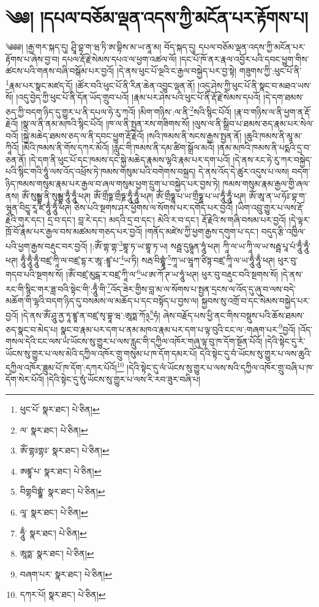 \setcounter{footnote}{0} 
\chapter{༄༅། །དཔལ་བཅོམ་ལྡན་འདས་ཀྱི་མངོན་པར་རྟོགས་པ།}༄༅༅། །རྒྱ་གར་སྐད་དུ། ཤྲཱི་བྷ་ག་ཝ་ཏི་ཨ་བྷིས་མ་ཡ་ནཱ་མ། བོད་སྐད་དུ། དཔལ་བཅོམ་ལྡན་འདས་ཀྱི་མངོན་པར་རྟོགས་པ་ཞེས་བྱ་བ། དཔལ་རྡོ་རྗེ་སེམས་དཔའ་ལ་ཕྱག་འཚལ་ལོ། །དང་པོ་ཁོ་ནར་རྣལ་འབྱོར་པའི་དབང་ཕྱུག་གིས་ཚངས་པའི་གནས་བཞི་བསྒོམ་པར་བྱའོ། །དེ་ནས་ཕུང་པོ་ལྔའི་ང་རྒྱལ་བསྐྱེད་པར་བྱ་སྟེ། གཟུགས་ཀྱི་:ཕུང་པོ་ནི་\footnote{ཕུང་པོ་  སྣར་ཐང་།  པེ་ཅིན། }རྣམ་པར་སྣང་མཛད་དོ། །ཚོར་བའི་ཕུང་པོ་ནི་རིན་ཆེན་འབྱུང་ལྡན་ནོ། །འདུ་ཤེས་ཀྱི་ཕུང་པོ་ནི་སྣང་བ་མཐའ་ཡས་སོ། །འདུ་བྱེད་ཀྱི་ཕུང་པོ་ནི་དོན་ཡོད་གྲུབ་པའོ། །རྣམ་པར་ཤེས་པའི་ཕུང་པོ་ནི་རྡོ་རྗེ་སེམས་དཔའོ། །དེ་དག་ཐམས་ཅད་ཀྱི་བདག་ཉིད་དུ་གྱུར་པ་ནི་དཔལ་ཧེ་རུ་ཀའོ། །མིག་གཉིས་:ལ་ནི་\footnote{ལ་  སྣར་ཐང་།  པེ་ཅིན། }སའི་སྙིང་པོའོ། །རྣ་བ་གཉིས་ལ་ནི་ཕྱག་ན་རྡོ་རྗེའོ། །སྣ་ལ་ནི་ནམ་མཁའི་སྙིང་པོའོ། །ཁ་ལ་ནི་སྤྱན་རས་གཟིགས་སོ། །ལུས་ལ་ནི་སྒྲིབ་པ་ཐམས་ཅད་རྣམ་པར་སེལ་བའོ། །སྐྱེ་མཆེད་ཐམས་ཅད་ལ་ནི་དབང་ཕྱུག་རྡོ་རྗེའོ། །སའི་ཁམས་ནི་སངས་རྒྱས་སྤྱན་ནོ། །ཆུའི་ཁམས་ནི་མཱ་མ་ཀཱིའོ། །མེའི་ཁམས་ནི་གོས་དཀར་མོའོ། །རླུང་གི་ཁམས་ནི་དམ་ཚིག་སྒྲོལ་མའོ། །ནམ་མཁའི་ཁམས་ནི་པདྨའི་དྲ་བ་ཅན་ནོ། །དེ་དག་ནི་ཕུང་པོ་དང་ཁམས་དང་སྐྱེ་མཆེད་རྣམས་ལྷའི་རྣམ་པར་དག་པའོ། །དེ་ནས་རང་ཧེ་རུ་ཀར་བསྐྱེད་པའི་སྙིང་གའི་ཧཱུཾ་ལས་འོད་འཕྲོས་ཏེ་ཁམས་གསུམ་པའི་བགེགས་བསྐྲད། དེ་ནས་འོད་དེ་ཚུར་འདུས་པ་ལས། བདག་ཉིད་ཁམས་གསུམ་རྣམ་པར་རྒྱལ་བ་ཞལ་གསུམ་ཕྱག་དྲུག་པ་བསྐྱེད་པར་བྱས་ཏེ། ཁམས་གསུམ་རྣམ་རྒྱལ་གྱི་ཞལ་ནས། ཨོཾ་སུམྦྷ་ནི་སུམྦྷ་ཧཱུྃ་ཧཱུྃ་ཕཊ། ཨོཾ་གྲྀཧྞ་གྲྀཧྞ་ཧཱུྃ་ཧཱུྃ་ཕཊ། ཨོཾ་གྲྀཧྞཱ་པ་ཡ་གྲྀཧྞཱ་པ་ཡ་ཧཱུྃ་ཧཱུྃ་ཕཊ། ཨོཾ་ཨཱ་ན་ཡ་ཧོཿ་བྷ་ག་ཝཱན་བིདྱཱ་རཱ་ཛ་ཧཱུྃ་ཧཱུྃ་ཕཊ། ཅེས་པའི་སྔགས་ཤར་ཕྱོགས་ལ་སོགས་པར་དགོད་པར་བྱའོ། །ཡིག་འབྲུ་གྱུར་པ་ལས་རྡོ་རྗེའི་གུར་དང་། དྲ་བ་དང་། བླ་རེ་དང་། མདའི་དྲ་བ་དང་། མེའི་ར་བ་དང་། རྡོ་རྗེའི་ས་གཞི་བསམ་པར་བྱའོ། །དེ་ལྟར་ཁྲོ་བོ་རྣམ་པར་རྒྱལ་བས་མཚམས་གཅད་པར་བྱའོ། །གནོད་མཛེས་ཀྱི་ཕྱག་རྒྱས་དགུག་པ་དང་། བདུད་རྩི་འཁྱིལ་པའི་ཕྱག་རྒྱས་བརྡུང་བར་བྱའོ། །:ཨོཾ་གྷ་གྷ་\footnote{ཨོཾ་གྷཿགྷཿ་  སྣར་ཐང་།  པེ་ཅིན། }གྷཱ་ཏ་ཡ་གྷཱ་ཏ་ཡ། སརྦྦ་དུཥྚཱན་ཧཱུཾ་ཕཊ། ཀཱི་ལ་ཡ་ཀཱི་ལ་ཡ་སརྦྦ་པཱ་པཾ་ཧཱུྃ་ཧཱུྃ་ཕཊ། ཧཱུྃ་ཧཱུྃ་ཧཱུྃ་བཛྲ་ཀཱི་ལ་བཛྲ་དྷ་ར་ཨཱ་:ཛྙཱ་པ་\footnote{ཨཛྙཱ་པ་  སྣར་ཐང་།  པེ་ཅིན། }ཡ་ཏི། སརྦ་བིགྷྣཱཾ་\footnote{བིགྷབིགྷྣཾ་  སྣར་ཐང་།  པེ་ཅིན། }ཀཱ་ཡ་ཝཱཀ་ཙིཏྟ་བཛྲ་ཀཱི་ལ་ཡ་ཧཱུྃ་ཧཱུྃ་ཕཊ། ཕུར་བུ་གདབ་པའི་སྔགས་སོ། །ཨོཾ་བཛྲ་མུངྒ་ར་བཛྲ་ཀཱི་ལ་\footnote{ལཱ་  སྣར་ཐང་།  པེ་ཅིན། }ཡ་ཨ་ཀོ་ཊ་ཡ་ཧཱུཾ་ཕཊ། ཕུར་བུ་བརྡུང་བའི་སྔགས་སོ། །དེ་ནས་རང་གི་སྙིང་གར་ཟླ་བའི་སྟེང་གི་:ཧཱུྃ་གི་\footnote{ཧཱུྃ་  སྣར་ཐང་།  པེ་ཅིན། }འོད་ཟེར་གྱིས་བླ་མ་ལ་སོགས་པ་སྤྱན་དྲངས་ལ་འོད་དུ་ཞུ་བ་ལས་བདེ་མཆོག་གི་ལྷའི་བདག་ཉིད་དུ་བསམས་ལ་མཆོད་པ་དང་བསྟོད་པ་བྱས་ལ། སྐྱབས་སུ་འགྲོ་བ་དང་སེམས་བསྐྱེད་པར་བྱའོ། །དེ་ནས་ཨོཾ་ཤཱུ་ནྱ་ཏཱ་ཛྙཱ་ན་བཛྲ་སྭ་བྷཱ་ཝ་:ཨཱཏྨ་ཀོ྅\footnote{ཨཱཏྨ་  སྣར་ཐང་།  པེ་ཅིན། }ཧཾ། ཞེས་བརྗོད་པས་ཕྱི་ནང་གིས་བསྡུས་པའི་ཆོས་ཐམས་ཅད་སྣང་བ་མེད་པ། སྣང་བ་རྣམ་པར་དག་པ་ནམ་མཁའ་རྣམ་པར་དག་པ་ལྟ་བུའི་ངང་ལ་:གཞག་པར་\footnote{བཞག་པར་  སྣར་ཐང་།  པེ་ཅིན། }བྱའོ། །འོད་གསལ་དེའི་ངང་ལས་ཡཾ་ཡོངས་སུ་གྱུར་པ་ལས་རླུང་གི་དཀྱིལ་འཁོར་གཞུ་ལྟ་བུ་ཁ་དོག་སྔོན་པོའོ། །དེའི་སྟེང་དུ་རཾ་ཡོངས་སུ་གྱུར་པ་ལས་མེའི་དཀྱིལ་འཁོར་གྲུ་གསུམ་པ་ཁ་དོག་དམར་པོ། དེའི་སྟེང་དུ་བཾ་ཡོངས་སུ་གྱུར་པ་ལས་ཆུའི་དཀྱིལ་འཁོར་ཟླུམ་པོ་ཁ་དོག་:དཀར་པོའོ།\footnote{དཀར་པོ།  སྣར་ཐང་།  པེ་ཅིན། } །དེའི་སྟེང་དུ་ལཾ་ཡོངས་སུ་གྱུར་པ་ལས་སའི་དཀྱིལ་འཁོར་གྲུ་བཞི་པ་ཁ་དོག་སེར་པོའོ། །དེའི་སྟེང་དུ་སུཾ་ཡོངས་སུ་གྱུར་པ་ལས་རི་རབ་ཟུར་བཞི་པ། 
